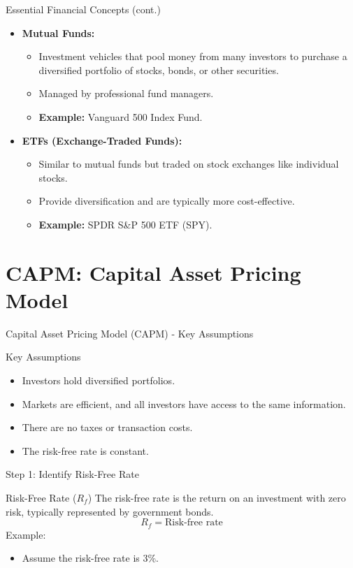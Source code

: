 \documentclass{beamer}
\begin{document}
\begin{frame}{Essential Financial Concepts (cont.)}
    \begin{itemize}
        \item \textbf{Mutual Funds:}
        \begin{itemize}
            \item Investment vehicles that pool money from many investors to purchase a diversified portfolio of stocks, bonds, or other securities.
            \item Managed by professional fund managers.
            \item \textbf{Example:} Vanguard 500 Index Fund.
        \end{itemize}
        \item \textbf{ETFs (Exchange-Traded Funds):}
        \begin{itemize}
            \item Similar to mutual funds but traded on stock exchanges like individual stocks.
            \item Provide diversification and are typically more cost-effective.
            \item \textbf{Example:} SPDR S\&P 500 ETF (SPY).
        \end{itemize}
    \end{itemize}
\end{frame}

\section{CAPM: Capital Asset Pricing Model}
\begin{frame}{Capital Asset Pricing Model (CAPM) - Key Assumptions}
  \begin{block}{Key Assumptions}
    \begin{itemize}
      \item Investors hold diversified portfolios.
      \item Markets are efficient, and all investors have access to the same information.
      \item There are no taxes or transaction costs.
      \item The risk-free rate is constant.
    \end{itemize}
  \end{block}
\end{frame}

\begin{frame}{Step 1: Identify Risk-Free Rate}
  \begin{block}{Risk-Free Rate (\(R_f\))}
    The risk-free rate is the return on an investment with zero risk, typically represented by government bonds.
    \begin{equation*}
      R_f = \text{Risk-free rate}
    \end{equation*}
    Example:
    \begin{itemize}
      \item Assume the risk-free rate is 3\%.
    \end{itemize}
  \end{block}
\end{frame}
\end{document}
